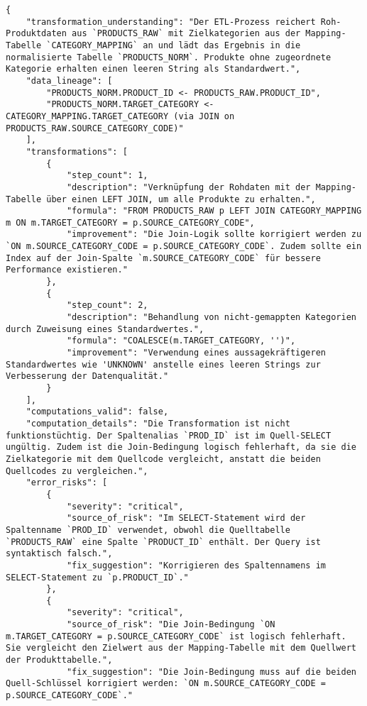 \begin{lstlisting}[caption={Ausgabe: GEMINI 2.5 Pro Anwendungsfall 6 Konsistenzdurchlauf},label={gemini_case6_prompt2}]
{
    "transformation_understanding": "Der ETL-Prozess reichert Roh-Produktdaten aus `PRODUCTS_RAW` mit Zielkategorien aus der Mapping-Tabelle `CATEGORY_MAPPING` an und lädt das Ergebnis in die normalisierte Tabelle `PRODUCTS_NORM`. Produkte ohne zugeordnete Kategorie erhalten einen leeren String als Standardwert.",
    "data_lineage": [
        "PRODUCTS_NORM.PRODUCT_ID <- PRODUCTS_RAW.PRODUCT_ID",
        "PRODUCTS_NORM.TARGET_CATEGORY <- CATEGORY_MAPPING.TARGET_CATEGORY (via JOIN on PRODUCTS_RAW.SOURCE_CATEGORY_CODE)"
    ],
    "transformations": [
        {
            "step_count": 1,
            "description": "Verknüpfung der Rohdaten mit der Mapping-Tabelle über einen LEFT JOIN, um alle Produkte zu erhalten.",
            "formula": "FROM PRODUCTS_RAW p LEFT JOIN CATEGORY_MAPPING m ON m.TARGET_CATEGORY = p.SOURCE_CATEGORY_CODE",
            "improvement": "Die Join-Logik sollte korrigiert werden zu `ON m.SOURCE_CATEGORY_CODE = p.SOURCE_CATEGORY_CODE`. Zudem sollte ein Index auf der Join-Spalte `m.SOURCE_CATEGORY_CODE` für bessere Performance existieren."
        },
        {
            "step_count": 2,
            "description": "Behandlung von nicht-gemappten Kategorien durch Zuweisung eines Standardwertes.",
            "formula": "COALESCE(m.TARGET_CATEGORY, '')",
            "improvement": "Verwendung eines aussagekräftigeren Standardwertes wie 'UNKNOWN' anstelle eines leeren Strings zur Verbesserung der Datenqualität."
        }
    ],
    "computations_valid": false,
    "computation_details": "Die Transformation ist nicht funktionstüchtig. Der Spaltenalias `PROD_ID` ist im Quell-SELECT ungültig. Zudem ist die Join-Bedingung logisch fehlerhaft, da sie die Zielkategorie mit dem Quellcode vergleicht, anstatt die beiden Quellcodes zu vergleichen.",
    "error_risks": [
        {
            "severity": "critical",
            "source_of_risk": "Im SELECT-Statement wird der Spaltenname `PROD_ID` verwendet, obwohl die Quelltabelle `PRODUCTS_RAW` eine Spalte `PRODUCT_ID` enthält. Der Query ist syntaktisch falsch.",
            "fix_suggestion": "Korrigieren des Spaltennamens im SELECT-Statement zu `p.PRODUCT_ID`."
        },
        {
            "severity": "critical",
            "source_of_risk": "Die Join-Bedingung `ON m.TARGET_CATEGORY = p.SOURCE_CATEGORY_CODE` ist logisch fehlerhaft. Sie vergleicht den Zielwert aus der Mapping-Tabelle mit dem Quellwert der Produkttabelle.",
            "fix_suggestion": "Die Join-Bedingung muss auf die beiden Quell-Schlüssel korrigiert werden: `ON m.SOURCE_CATEGORY_CODE = p.SOURCE_CATEGORY_CODE`."

\end{lstlisting}
